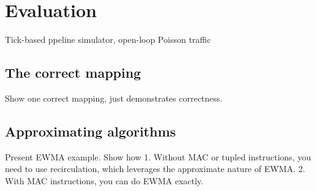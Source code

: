\section{Evaluation}
\label{s:evaluation}
Tick-based ppeline simulator, open-loop Poisson traffic

\subsection{The correct mapping}
Show one correct mapping, just demonstrates correctness.

\subsection{Approximating algorithms}
Present EWMA example. Show how
1. Without MAC or tupled instructions, you need to use recirculation, which leverages the approximate nature of EWMA.
2. With MAC instructions, you can do EWMA exactly.
